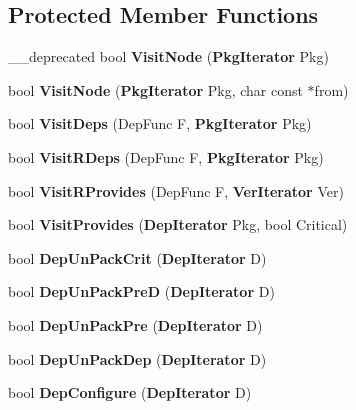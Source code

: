 \subsection*{\-Protected \-Member \-Functions}
\begin{DoxyCompactItemize}
\item 
\-\_\-\-\_\-deprecated bool {\bfseries \-Visit\-Node} ({\bf \-Pkg\-Iterator} \-Pkg)\label{classpkgOrderList_aab2737947eae78e69a0f024fc575ddbc}

\item 
bool {\bfseries \-Visit\-Node} ({\bf \-Pkg\-Iterator} \-Pkg, char const $\ast$from)\label{classpkgOrderList_a4054c81f3fe66d77d66b342ddc81e843}

\item 
bool {\bfseries \-Visit\-Deps} (\-Dep\-Func \-F, {\bf \-Pkg\-Iterator} \-Pkg)\label{classpkgOrderList_af28d9ac411f384afa7b1dd190cd00fa3}

\item 
bool {\bfseries \-Visit\-R\-Deps} (\-Dep\-Func \-F, {\bf \-Pkg\-Iterator} \-Pkg)\label{classpkgOrderList_a3c6f8eaf5083b3003f8c2c3859709eab}

\item 
bool {\bfseries \-Visit\-R\-Provides} (\-Dep\-Func \-F, {\bf \-Ver\-Iterator} \-Ver)\label{classpkgOrderList_aeb5a92567bc6bf1d96afc03fe8434169}

\item 
bool {\bfseries \-Visit\-Provides} ({\bf \-Dep\-Iterator} \-Pkg, bool \-Critical)\label{classpkgOrderList_aed4837fe3ea1ec3de4019d15db8d0da1}

\item 
bool {\bfseries \-Dep\-Un\-Pack\-Crit} ({\bf \-Dep\-Iterator} \-D)\label{classpkgOrderList_a3c87cf5babc9111d0e9df7a360f22603}

\item 
bool {\bfseries \-Dep\-Un\-Pack\-Pre\-D} ({\bf \-Dep\-Iterator} \-D)\label{classpkgOrderList_a6c845607b0f5b281ca968e6be20ba0fc}

\item 
bool {\bfseries \-Dep\-Un\-Pack\-Pre} ({\bf \-Dep\-Iterator} \-D)\label{classpkgOrderList_a7fff61bd9b685790a31c21673a64aff9}

\item 
bool {\bfseries \-Dep\-Un\-Pack\-Dep} ({\bf \-Dep\-Iterator} \-D)\label{classpkgOrderList_ae865929b842d2c796957cee8bd91abf8}

\item 
bool {\bfseries \-Dep\-Configure} ({\bf \-Dep\-Iterator} \-D)\label{classpkgOrderList_a2f2f85e3f7e5ff919c0fcf45b9476189}


\end{DoxyCompactItemize}
